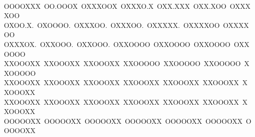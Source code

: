 \documentclass[12pt]{article}
\begin{document}
\begin{center}
{~\\
OOOOXXX~OO.OOOX~OXXXOOX~OXXXO.X~OXX.XXX~OXX.XOO~OXXXXOO\\
OXOO.X.~OXOOOO.~OXXXOO.~OXXXOO.~OXXXXX.~OXXXXOO~OXXXXOO\\
OXXXOX.~OXXOOO.~OXXOOO.~OXXOOOO~OXXOOOO~OXXOOOO~OXXOOOO\\
XXOOOXX~XXOOOXX~XXOOOXX~XXOOOOO~XXOOOOO~XXOOOOO~XXOOOOO\\
XXOOOXX~XXOOOXX~XXOOOXX~XXOOOXX~XXOOOXX~XXOOOXX~XXOOOXX\\
XXOOOXX~XXOOOXX~XXOOOXX~XXOOOXX~XXOOOXX~XXOOOXX~XXOOOXX\\
OOOOOXX~OOOOOXX~OOOOOXX~OOOOOXX~OOOOOXX~OOOOOXX~OOOOOXX
}\end{center}
\end{document}
